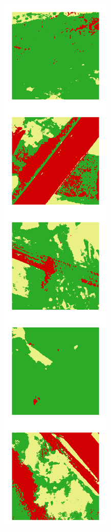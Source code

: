 \begin{figure}[h]
\begin{subfigure}{\UnetPredictionsImageWidth}
        \caption{}
        \label{fig:unet_pred_label}
    \end{subfigure} \hspace{2mm}
    \begin{subfigure}{\UnetPredictionsImageWidth}
        \includegraphics[width=\textwidth]{images/unet/unet-18D}

\end{subfigure}
\end{figure}
